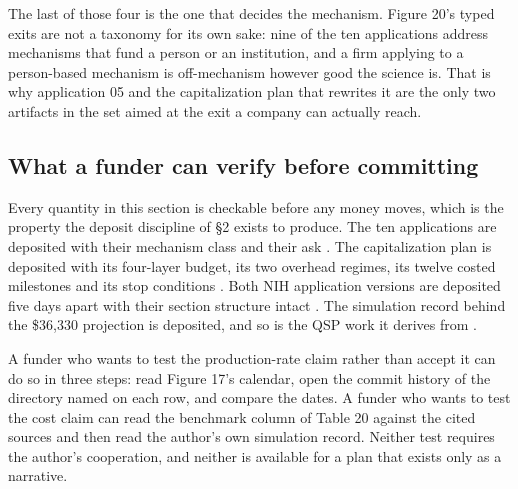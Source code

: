 The last of those four is the one that decides the mechanism. Figure 20's typed
exits are not a taxonomy for its own sake: nine of the ten applications address
mechanisms that fund a person or an institution, and a firm applying to a
person-based mechanism is off-mechanism however good the science is. That is why
application 05 and the capitalization plan that rewrites it are the only two
artifacts in the set aimed at the exit a company can actually reach.

\subsection{What a funder can verify before committing}

Every quantity in this section is checkable before any money moves, which is the
property the deposit discipline of \S2 exists to produce. The ten applications
are deposited with their mechanism class and their ask
\cite{tenapps2026}. The capitalization plan is deposited with its four-layer
budget, its two overhead regimes, its twelve costed milestones and its stop
conditions \cite{capplan2026}. Both NIH application versions are deposited five
days apart with their section structure intact
\cite{rfarm27001v1, rfarm27001v2}. The simulation record behind the \$36,330
projection is deposited, and so is the QSP work it derives from
\cite{qspmetpancre, digitaltwinfda2025}.

A funder who wants to test the production-rate claim rather than accept it can
do so in three steps: read Figure 17's calendar, open the commit history of the
directory named on each row, and compare the dates. A funder who wants to test
the cost claim can read the benchmark column of Table 20 against the cited
sources and then read the author's own simulation record. Neither test requires
the author's cooperation, and neither is available for a plan that exists only
as a narrative.
